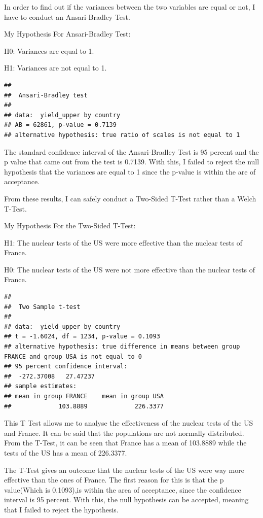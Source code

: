 \documentclass[
  12pt,
]{article}
\begin{document}
In order to find out if the variances between the two variables are equal or not, I have to conduct an Ansari-Bradley Test.

My Hypothesis For Ansari-Bradley Test:

H0: Variances are equal to 1.

H1: Variances are not equal to 1.

\begin{verbatim}
## 
##  Ansari-Bradley test
## 
## data:  yield_upper by country
## AB = 62861, p-value = 0.7139
## alternative hypothesis: true ratio of scales is not equal to 1
\end{verbatim}

The standard confidence interval of the Ansari-Bradley Test is 95 percent and the p value that came out from the test is 0.7139. With this, I failed to reject the null hypothesis that the variances are equal to 1 since the p-value is within the are of acceptance.

From these results, I can safely conduct a Two-Sided T-Test rather than a Welch T-Test.

My Hypothesis For the Two-Sided T-Test:

H1: The nuclear tests of the US were more effective than the nuclear tests of France.

H0: The nuclear tests of the US were not more effective than the nuclear tests of France.

\begin{verbatim}
## 
##  Two Sample t-test
## 
## data:  yield_upper by country
## t = -1.6024, df = 1234, p-value = 0.1093
## alternative hypothesis: true difference in means between group FRANCE and group USA is not equal to 0
## 95 percent confidence interval:
##  -272.37008   27.47237
## sample estimates:
## mean in group FRANCE    mean in group USA 
##             103.8889             226.3377
\end{verbatim}

This T Test allows me to analyse the effectiveness of the nuclear tests of the US and France. It can be said that the populations are not normally distributed. From the T-Test, it can be seen that France has a mean of 103.8889 while the tests of the US has a mean of 226.3377.

The T-Test gives an outcome that the nuclear tests of the US were way more effective than the ones of France. The first reason for this is that the p value(Which is 0.1093),is within the area of acceptance, since the confidence interval is 95 percent. With this, the null hypothesis can be accepted, meaning that I failed to reject the hypothesis.
\end{document}
